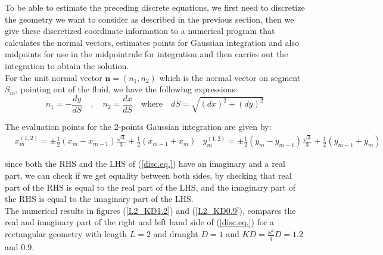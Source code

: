 \documentclass[a4paper,10pt]{article}
\begin{document}
To be able to estimate the preceding discrete equations, we first need to discretize the geometry we want to consider as described in the previous section, then we give these discretized coordinate information to a numerical program that calculates the normal vectors, estimates points for Gaussian integration and also midpoints for use in the midpointrule for integration and then carries out the integration to obtain the solution.\\[1 em]

For the unit normal vector $\textbf{n} = (n_1 , n_2)$ which is the normal vector on segment $S_m$, pointing out of the fluid, we have the following expressions:\\
$$n_1 = -\frac{dy}{dS} \quad , \quad n_2 = \frac{dx}{dS} \quad \text{where} \quad dS = \sqrt{(dx)^2 + (dy)^2} $$ 

The evaluation points for the 2-points Gaussian integration are given by:
\begin{align*}
& x_m^{(1,2)} = \pm \frac{1}{2} (x_m - x_{m-1}) \frac{\sqrt{3}}{3} + \frac{1}{2} (x_{m-1} + x_m)
& y_m^{(1,2)} = \pm \frac{1}{2} (y_m - y_{m-1}) \frac{\sqrt{3}}{3} + \frac{1}{2} (y_{m-1} + y_m)
\end{align*}

since both the RHS and the LHS of (\ref{disc.eq.}) have an imaginary and a real part, we can check if we get equality between both sides, by checking that real part of the RHS is equal to the real part of the LHS, and the imaginary part of the RHS is equal to the imaginary part of the LHS.\\[1 em]

The numerical results in figures (\ref{L2_KD1.2}) and (\ref{L2_KD0.9}), compares the real and imaginary part of the right and left hand side of (\ref{disc.eq.}) for a rectangular geometry with length $L=2$ and draught $D=1$ and $K D = \frac{\omega^2}{g} D = 1.2$ and $0.9$. \\[1 em]
\end{document}
